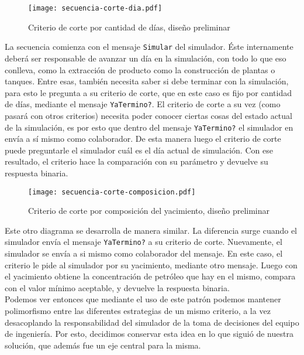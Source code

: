 \begin{figure}[H]
\caption{Criterio de corte por cantidad de días, diseño preliminar}
\centering
\texttt{[image: secuencia-corte-dia.pdf]}
\end{figure}

La secuencia comienza con el mensaje \texttt{Simular} del simulador. Éste 
internamente deberá ser responsable de avanzar un día en la simulación, con 
todo lo que eso conlleva, como la extracción de producto como la construcción 
de plantas o tanques. Entre esas, también necesita saber si debe terminar con la 
simulación, para esto le pregunta a su criterio de corte, que en este caso es 
fijo por cantidad de días, mediante el mensaje \texttt{YaTermino?}. El criterio 
de corte a su vez (como pasará con otros criterios) necesita poder conocer 
ciertas cosas del estado actual de la simulación, es por esto que dentro del 
mensaje \texttt{YaTermino?} el simulador en envía a sí mismo como colaborador. 
De esta manera luego el criterio de corte puede preguntarle el simulador 
cuál es el día actual de simulación. Con ese resultado, el criterio hace la 
comparación con su parámetro y devuelve su respuesta binaria. 

\begin{figure}[H]
\caption{Criterio de corte por composición del yacimiento, diseño preliminar}
\centering
\texttt{[image: secuencia-corte-composicion.pdf]}
\end{figure}

Este otro diagrama se desarrolla de manera similar. La diferencia surge cuando 
el simulador envía el mensaje \texttt{YaTermino?} a su criterio de corte. 
Nuevamente, el simulador se envía a si mismo como colaborador del mensaje. En 
este caso, el criterio le pide al simulador por su yacimiento, mediante otro 
mensaje. Luego con el yacimiento obtiene la concentración de petróleo que hay en 
el mismo, compara con el valor mínimo aceptable, y devuelve la respuesta binaria. \\

Podemos ver entonces que mediante el uso de este patrón podemos mantener 
polimorfismo entre las diferentes estrategias de un mismo criterio, a la vez 
desacoplando la responsabilidad del simulador de la toma de decisiones del 
equipo de ingeniería. Por esto, decidimos conservar esta idea en lo que siguió 
de nuestra solución, que además fue un eje central para la misma. 


